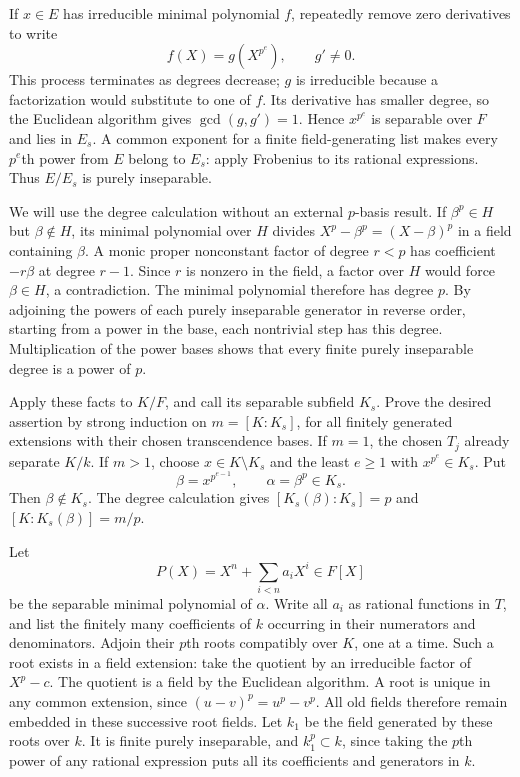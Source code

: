 \documentclass[11pt,a4paper,openany]{report}
\begin{document}
If \(x\in E\) has irreducible minimal polynomial \(f\), repeatedly remove zero derivatives to write \[f(X)=g(X^{p^e}),\qquad g'\ne0.\] This process terminates as degrees decrease; \(g\) is irreducible because a factorization would substitute to one of \(f\). Its derivative has smaller degree, so the Euclidean algorithm gives \(\gcd(g,g')=1\). Hence \(x^{p^e}\) is separable over \(F\) and lies in \(E_s\). A common exponent for a finite field-generating list makes every \(p^e\)th power from \(E\) belong to \(E_s\): apply Frobenius to its rational expressions. Thus \(E/E_s\) is purely inseparable.

We will use the degree calculation without an external \(p\)-basis result. If \(\beta^p\in H\) but \(\beta\notin H\), its minimal polynomial over \(H\) divides \(X^p-\beta^p=(X-\beta)^p\) in a field containing \(\beta\). A monic proper nonconstant factor of degree \(r<p\) has coefficient \(-r\beta\) at degree \(r-1\). Since \(r\) is nonzero in the field, a factor over \(H\) would force \(\beta\in H\), a contradiction. The minimal polynomial therefore has degree \(p\). By adjoining the powers of each purely inseparable generator in reverse order, starting from a power in the base, each nontrivial step has this degree. Multiplication of the power bases shows that every finite purely inseparable degree is a power of \(p\).

Apply these facts to \(K/F\), and call its separable subfield \(K_s\). Prove the desired assertion by strong induction on \(m=[K:K_s]\), for all finitely generated extensions with their chosen transcendence bases. If \(m=1\), the chosen \(T_j\) already separate \(K/k\). If \(m>1\), choose \(x\in K\setminus K_s\) and the least \(e\geq1\) with \(x^{p^e}\in K_s\). Put \[\beta=x^{p^{e-1}},\qquad \alpha=\beta^p\in K_s.\] Then \(\beta\notin K_s\). The degree calculation gives \([K_s(\beta):K_s]=p\) and \([K:K_s(\beta)]=m/p\).

Let \[P(X)=X^n+\sum_{i<n}a_iX^i\in F[X]\] be the separable minimal polynomial of \(\alpha\). Write all \(a_i\) as rational functions in \(T\), and list the finitely many coefficients of \(k\) occurring in their numerators and denominators. Adjoin their \(p\)th roots compatibly over \(K\), one at a time. Such a root exists in a field extension: take the quotient by an irreducible factor of \(X^p-c\). The quotient is a field by the Euclidean algorithm. A root is unique in any common extension, since \((u-v)^p=u^p-v^p\). All old fields therefore remain embedded in these successive root fields. Let \(k_1\) be the field generated by these roots over \(k\). It is finite purely inseparable, and \(k_1^p\subset k\), since taking the \(p\)th power of any rational expression puts all its coefficients and generators in \(k\).
\end{document}
